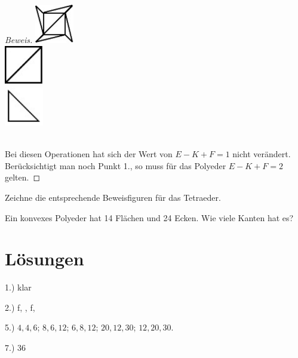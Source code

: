 \documentclass[%
11pt,%
twoside,%
titlepage,%
a4page,%
german,%
headsepline%
]{scrartcl}
\begin{document}
\begin{proof}[Beweis]
\begin{minipage}{1.7cm}
\includegraphics[width=1.7cm]{pictures/wuerf4}\\[6ex]
\includegraphics[width=1.7cm]{pictures/wuerf5}\\[7ex]
\includegraphics[width=1.7cm]{pictures/wuerf6}
\end{minipage}\\
Bei diesen Operationen hat sich der Wert von $E-K+F=1$ nicht ver\"andert. Ber\"ucksichtigt man noch Punkt 1., so muss f\"ur das Polyeder $E-K+F=2$ gelten.
\end{proof}

\begin{ueb}
Zeichne die entsprechende Beweisfiguren f\"ur das Tetraeder.
\end{ueb}

\begin{ueb}
Ein konvexes Polyeder hat 14 Fl\"achen und 24 Ecken. Wie viele Kanten hat es?
\end{ueb}

\section*{L\"osungen}

1.) klar

2.) f, \checkmark, f, \checkmark

5.) $4,4,6$; $8,6,12$; $6,8,12$; $20,12,30$; $12,20,30$.

7.) $36$
\end{document}
